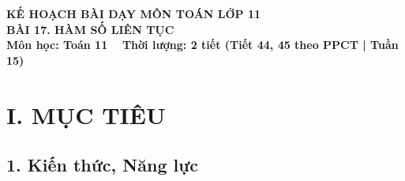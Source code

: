 \documentclass[12pt, a4paper]{article}
\begin{document}
\begin{center}
    {\fontsize{14pt}{17pt}\selectfont \textbf{KẾ HOẠCH BÀI DẠY MÔN TOÁN LỚP 11}}\\[6pt]
    {\fontsize{16pt}{19pt}\selectfont \textbf{BÀI 17. HÀM SỐ LIÊN TỤC}}\\[4pt]
    {\fontsize{12pt}{15pt}\selectfont \textbf{Môn học: Toán 11} \ \textbar \ \textbf{Thời lượng: 2 tiết (Tiết 44, 45 theo PPCT | Tuần 15)}}
\end{center}

\vspace{5pt}

\section*{I. MỤC TIÊU}

\subsection*{1. Kiến thức, Năng lực}
\end{document}
